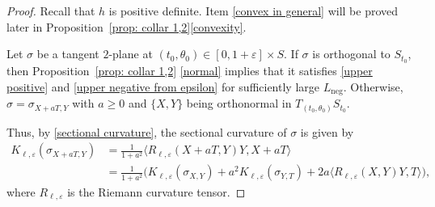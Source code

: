 \documentclass[10pt]{amsart}
\newcommand{\Neg}{\mathrm{neg}}
\theoremstyle{definition}
\let\eps\varepsilon
\renewcommand{\>}{{\rangle}}
\newcommand{\<}{{\langle}}
\begin{document}
\begin{proof}
Recall that $h$ is positive definite.
Item \eqref{convex in general} will be proved later in Proposition~\ref{prop: collar 1,2}\eqref{convexity}.

Let $\sigma$ be a tangent $2$-plane at $(t_0,\theta_0)\in[0,1+\eps]\times S$. If $\sigma$ is orthogonal to $S_{t_0}$, then Proposition~\ref{prop: collar 1,2} \eqref{normal} implies that it satisfies \ref{upper positive} and \ref{upper negative from epsilon} for sufficiently large $L_{\Neg}$. Otherwise, $\sigma=\sigma_{X+aT,Y}$ with $a\geq 0$ and $\{X,Y\}$ being orthonormal in $T_{(t_0,\theta_0)}S_{t_0}$.

Thus, by \eqref{sectional curvature}, the sectional curvature of $\sigma$ is given by
\begin{equation}\label{sectional mixed expression}
\begin{aligned}
K_{\ell,\eps}(\sigma_{X+aT,Y}) &= \frac{1}{1+a^2}\langle R_{\ell,\eps}(X+aT,Y)Y,X+aT\rangle\\
&= \frac{1}{1+a^2}\bigl(K_{\ell,\eps}(\sigma_{X,Y})+a^2K_{\ell,\eps}(\sigma_{Y,T})+2a\langle R_{\ell,\eps}(X,Y)Y,T\rangle \bigr),
\end{aligned}
\end{equation}
where $R_{\ell,\eps}$ is the Riemann curvature tensor.


\end{proof}
\end{document}
